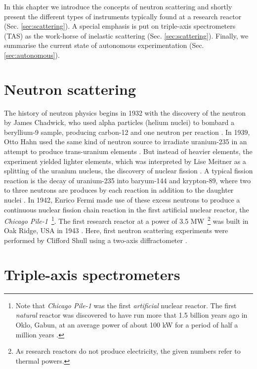 In this chapter we introduce the concepts of neutron scattering and shortly present the different types of instruments typically found at a research reactor (Sec. \ref{sec:scattering}). A special emphasis is put on triple-axis spectrometers (TAS) as the work-horse of inelastic scattering (Sec. \ref{sec:scattering}). Finally, we summarise the current state of autonomous experimentation (Sec. \ref{sec:autonomous}).



\section{Neutron scattering \label{sec:scattering}}

The history of neutron physics begins in 1932 with the discovery of the neutron by James Chadwick, who used alpha particles (helium nuclei) to bombard a beryllium-9 sample, producing carbon-12 and one neutron per reaction \cite[p.1]{Jacrot2021}. 
In 1939, Otto Hahn used the same kind of neutron source to irradiate uranium-235 in an attempt to produce trans-uranium elements \cite{wiki_fission}. But instead of heavier elements, the experiment yielded lighter elements, which was interpreted by Lise Meitner as a splitting of the uranium nucleus, the discovery of nuclear fission \cite{wiki_fission}. A typical fission reaction is the decay of uranium-235 into baryum-144 and krypton-89, where two to three neutrons are produces by each reaction in addition to the daughter nuclei \cite{wiki_fission}.
In 1942, Enrico Fermi made use of these excess neutrons to produce a continuous nuclear fission chain reaction \cite[p.1]{Jacrot2021} in the first artificial nuclear reactor, the \textit{Chicago Pile-1}~\footnote{Note that \textit{Chicago Pile-1} was the first \textit{artificial} nuclear reactor. The first \textit{natural} reactor was discovered to have run more that 1.5 billion years ago in Oklo, Gabun, at an average power of about 100 kW for a period of half a million years \cite{wiki_oklo}.}.
The first research reactor at a power of 3.5 MW~\footnote{As research reactors do not produce electricity, the given numbers refer to thermal powers.} was built in Oak Ridge, USA in 1943 \cite[p.3]{Jacrot2021}. Here, first neutron scattering experiments were performed by Clifford Shull using a two-axis diffractometer \cite[p.3]{Jacrot2021}.


\section{Triple-axis spectrometers \label{sec:tas}}

